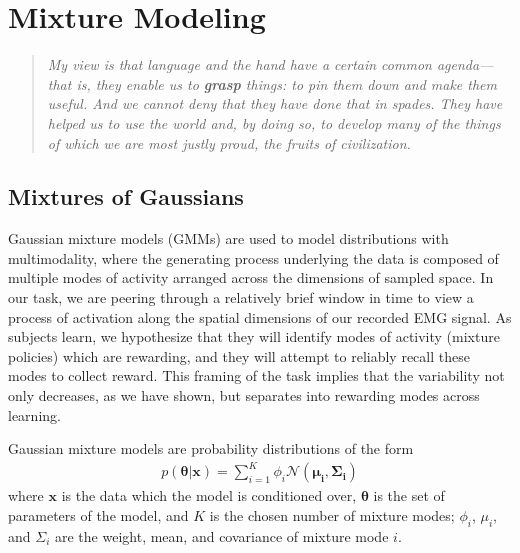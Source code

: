 \documentclass[../main.tex]{subfiles}
\begin{document}
\chapter{Mixture Modeling}\label{chap:gmms}

\bigskip
\begin{quote}
  \emph{My view is that language and the hand have a certain common agenda--- that is, they enable us to \textbf{grasp} things: to pin them down and make them useful. And we cannot deny that they have done that in spades. They have helped us to use the world and, by doing so, to develop many of the things of which we are most justly proud, the fruits of civilization.}\\
\end{quote}

\cleardoublepage%




\section{Mixtures of Gaussians}

Gaussian mixture models (GMMs) are used to model distributions with multimodality, where the generating process underlying the data is composed of multiple modes of activity arranged across the dimensions of sampled space. In our task, we are peering through a relatively brief window in time to view a process of activation along the spatial dimensions of our recorded EMG signal. As subjects learn, we hypothesize that they will identify modes of activity (mixture policies) which are rewarding, and they will attempt to reliably recall these modes to collect reward. This framing of the task implies that the variability not only decreases, as we have shown, but separates into rewarding modes across learning. 

Gaussian mixture models are probability distributions of the form
%
\begin{align}
  {\displaystyle p({\boldsymbol {\theta }} | \boldsymbol{x} )=\sum _{i=1}^{K}\phi _{i}{\mathcal {N}}({\boldsymbol {\mu _{i},\Sigma _{i}}})}
\end{align}
%
where $\boldsymbol{x}$ is the data which the model is conditioned over, $\boldsymbol{\theta}$ is the set of parameters of the model, and $K$ is the chosen number of mixture modes; $\phi_i$, $\mu_i$, and $\Sigma_i$ are the weight, mean, and covariance of mixture mode $i$.
\end{document}
